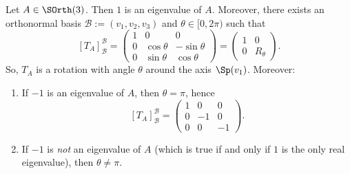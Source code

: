 \begin{proposition}
\label{prop:classification_so3}
Let $A \in \SOrth(3)$. Then $1$ is an eigenvalue of $A$. 
Moreover, there exists an orthonormal basis $\mathcal{B} := (v_1, v_2, v_3)$ and $\theta \in [0, 2\pi)$ such that
\[ [T_A]_{\mathcal{B}}^{\mathcal{B}} = \begin{pmatrix} 1 & 0 & 0 \\ 0 & \cos\theta & -\sin\theta \\ 0 & \sin\theta & \cos\theta \end{pmatrix} = \begin{pmatrix} 1 & 0 \\ 0 & R_\theta \end{pmatrix}. \]
So, $T_A$ is a rotation with angle $\theta$ around the axis $\Sp(v_1)$. Moreover:
\begin{enumerate}
    \item If $-1$ is an eigenvalue of $A$, then $\theta = \pi$, hence
    \[ [T_A]_{\mathcal{B}}^{\mathcal{B}} = \begin{pmatrix} 1 & 0 & 0 \\ 0 & -1 & 0 \\ 0 & 0 & -1 \end{pmatrix}. \]
    \item If $-1$ is \emph{not} an eigenvalue of $A$ (which is true if and only if $1$ is the only real eigenvalue), then $\theta \neq \pi$.
\end{enumerate}
\end{proposition}

\begin{center}
\end{center}

